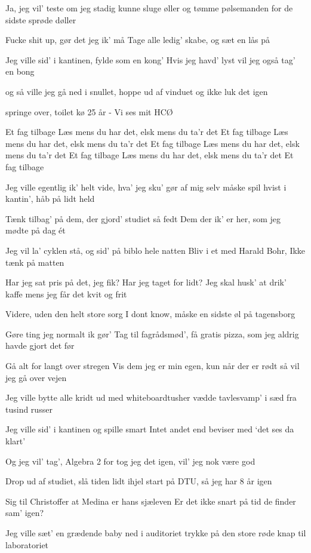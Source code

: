 \documentclass[a4paper,11pt]{article}
\begin{document}
\begin{song}
Ja, jeg vil’ teste om jeg stadig kunne sluge øller
og tømme pølsemanden for de sidste sprøde døller

%
Fucke shit up, gør det jeg ik’ må
Tage alle ledig’ skabe, og sæt en lås på

Jeg ville sid’ i kantinen, fylde som en kong’
Hvis jeg havd’ lyst vil jeg også tag’ en bong

og så ville jeg gå ned i snullet, hoppe ud af vinduet
og ikke luk det igen

springe over, toilet kø
25 år - Vi ses mit HCØ

%
Et fag tilbage
Læs mens du har det, elsk mens du ta’r det
Et fag tilbage
Læs mens du har det, elsk mens du ta’r det
Et fag tilbage
Læs mens du har det, elsk mens du ta’r det
Et fag tilbage
Læs mens du har det, elsk mens du ta’r det
Et fag tilbage

%
Jeg ville egentlig ik’ helt vide, hva’ jeg sku’ gør af mig selv
måske spil hvist i kantin’, håb på lidt held

Tænk tilbag’ på dem, der gjord’ studiet så fedt
Dem der ik’ er her, som jeg mødte på dag ét

Jeg vil la’ cyklen stå, og sid’ på biblo hele natten
Bliv i et med Harald Bohr, Ikke tænk på matten

Har jeg sat pris på det, jeg fik? Har jeg taget for lidt?
Jeg skal husk’ at drik’ kaffe mens jeg får det kvit og frit

%
Videre, uden den helt store sorg
I dont know, måske en sidste øl på tagensborg

Gøre ting jeg normalt ik gør’
Tag til fagrådsmød’, få gratis pizza, som jeg aldrig havde gjort det før

Gå alt for langt over stregen
Vis dem jeg er min egen, kun når der er rødt så vil jeg gå over vejen

Jeg ville bytte alle kridt ud med whiteboardtusher
vædde tavlesvamp’ i sæd fra tusind russer

%
Jeg ville sid’ i kantinen og spille smart
Intet andet end beviser med ‘det ses da klart’

Og jeg vil’ tag’, Algebra 2
for tog jeg det igen, vil’ jeg nok være god

Drop ud af studiet, slå tiden lidt ihjel
start på DTU, så jeg har 8 år igen

Sig til Christoffer at Medina er hans sjæleven
Er det ikke snart på tid de finder sam’ igen?

%
Jeg ville sæt’ en grædende baby ned i auditoriet
trykke på den store røde knap til laboratoriet


\end{song}
\end{document}
